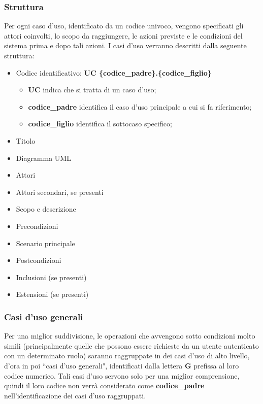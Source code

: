 \subsubsection{Struttura}
Per ogni caso d'uso, identificato da un codice univoco, vengono specificati gli attori coinvolti, lo scopo da raggiungere, le azioni previste e le condizioni del sistema prima e dopo tali azioni. I casi d'uso verranno descritti dalla seguente struttura:
\begin{itemize}
    \item Codice identificativo: \textbf{UC \{codice\_padre\}.\{codice\_figlio\}}
        \vspace{-5pt}
        \begin{itemize}
            \item \textbf{UC} indica che si tratta di un caso d'uso;
            \item \textbf{codice\_padre} identifica il caso d'uso principale a cui si fa riferimento;
            \item \textbf{codice\_figlio} identifica il sottocaso specifico;
        \end{itemize}
        \vspace{-5pt}
    \item Titolo
    \item Diagramma UML
    \item Attori
    \item Attori secondari, se presenti
    \item Scopo e descrizione
    \item Precondizioni
    \item Scenario principale
    \item Postcondizioni
    \item Inclusioni (se presenti)
    \item Estensioni (se presenti)
\end{itemize}
\subsubsection{Casi d'uso generali}
Per una miglior suddivisione, le operazioni che avvengono sotto condizioni molto simili (principalmente quelle che possono essere richieste da un utente autenticato con un determinato ruolo) saranno raggruppate in dei casi d'uso di alto livello, d'ora in poi ``casi d'uso generali", identificati dalla lettera \textbf{G} prefissa al loro codice numerico. Tali casi d'uso servono solo per una miglior comprensione, quindi il loro codice non verrà considerato come \textbf{codice\_padre} nell'identificazione dei casi d'uso raggruppati.

